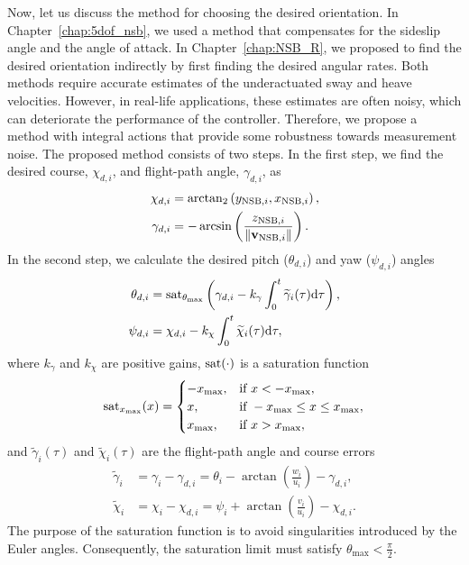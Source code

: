 Now, let us discuss the method for choosing the desired orientation.
In Chapter~\ref{chap:5dof_nsb}, we used a method that compensates for the sideslip angle and the angle of attack.
In Chapter~\ref{chap:NSB_R}, we proposed to find the desired orientation indirectly by first finding the desired angular rates.
Both methods require accurate estimates of the underactuated sway and heave velocities.
However, in real-life applications, these estimates are often noisy, which can deteriorate the performance of the controller.
Therefore, we propose a method with integral actions that provide some robustness towards measurement noise.
The proposed method consists of two steps.
In the first step, we find the desired course, $\chi_{d, i}$, and flight-path angle, $\gamma_{d, i}$, as
\begin{align}
    \chi_{d, i} &= {\rm arctan}_2\left({y}_{{\rm NSB}, i}, {x}_{{\rm NSB}, i}\right), \\
    \gamma_{d, i} &= - \arcsin\left(\frac{{z}_{{\rm NSB}, i}}{\left\|\mathbf{v}_{{\rm NSB}, i}\right\|}\right).
\end{align}
In the second step, we calculate the desired pitch ($\theta_{d, i}$) and yaw ($\psi_{d, i}$) angles
\begin{align}
    \theta_{d, i} &= {\rm sat}_{\theta_{\max}}\left(\gamma_{d, i} - k_{\gamma} \int_0^t \widetilde{\gamma}_i(\tau) {\rm d}\tau\right), \label{eq:distr_NSB_theta_ref} \\
    \psi_{d, i} &= \chi_{d, i} - k_{\chi} \int_0^t \widetilde{\chi}_i(\tau) {\rm d}\tau, \label{eq:distr_NSB_psi_ref}
\end{align}
where $k_{\gamma}$ and $k_{\chi}$ are positive gains, ${\rm sat}(\cdot)$ is a saturation function
\begin{equation}
    {\rm sat}_{x_{\max}}(x) = 
    \begin{cases}
        -x_{\max}, & \text{if } x < -x_{\max}, \\
        x, & \text{if } -x_{\max} \leq x \leq x_{\max}, \\
        x_{\max}, & \text{if } x > x_{\max},
    \end{cases}
\end{equation}
and $\widetilde{\gamma}_i(\tau)$ and $\widetilde{\chi}_i(\tau)$ are the flight-path angle and course errors
\begin{align}
    \widetilde{\gamma}_i &= \gamma_i - \gamma_{d, i} = \theta_i - \arctan\left(\frac{w_i}{u_i}\right) - \gamma_{d, i}, \\
    \widetilde{\chi}_i &= \chi_i - \chi_{d, i} = \psi_i + \arctan\left(\frac{v_i}{u_i}\right) - \chi_{d, i}.
\end{align}
The purpose of the saturation function is to avoid singularities introduced by the Euler angles.
Consequently, the saturation limit must satisfy $\theta_{\max} < \frac{\pi}{2}$.

